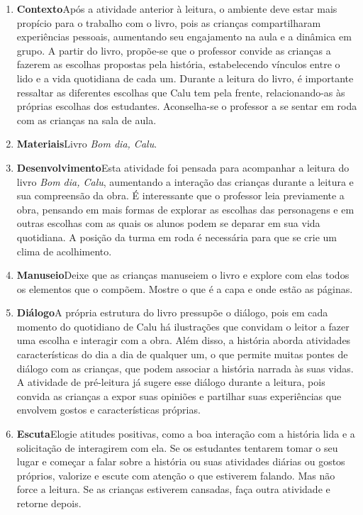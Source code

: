 \documentclass[11pt]{extarticle}
\begin{document}
\begin{enumerate}
\item \textbf{Contexto}\quad Após a atividade anterior à leitura, o ambiente deve estar mais propício para o trabalho com o livro, pois as crianças compartilharam experiências pessoais, aumentando seu engajamento na aula e a dinâmica em grupo. A partir do livro, propõe-se que 
o professor convide as crianças a fazerem as escolhas propostas pela história, estabelecendo vínculos entre o lido e a vida quotidiana de cada um.
Durante a leitura do livro, é importante ressaltar as diferentes escolhas que Calu tem pela frente, relacionando-as às próprias escolhas dos estudantes.
Aconselha-se o professor a se sentar em roda com as crianças na sala de aula.

\item \textbf{Materiais}\quad Livro \textit{Bom dia, Calu}.


\item \textbf{Desenvolvimento}\quad Esta atividade foi pensada para acompanhar a leitura do livro \textit{Bom dia, Calu}, aumentando a interação das crianças durante a leitura e sua compreensão da obra. É interessante que o professor leia previamente a obra, pensando em mais formas de explorar as escolhas das personagens e em outras escolhas com as quais os alunos podem se deparar em sua vida quotidiana.
A posição da turma em roda é necessária para que se crie um clima de acolhimento. 
 
\item \textbf{Manuseio}\quad Deixe que as crianças manuseiem o livro 
e explore com elas todos os elementos que o compõem. Mostre o que é a 
capa e onde estão as páginas.

\item \textbf{Diálogo}\quad A própria estrutura do livro pressupõe o diálogo, pois em cada momento do quotidiano de Calu há ilustrações que convidam o leitor a fazer uma escolha e interagir com a obra. Além disso, a história aborda atividades características do dia a dia de qualquer um, o que permite muitas pontes de diálogo com as crianças, que podem associar a história narrada às suas vidas. A atividade de pré-leitura já sugere esse diálogo durante a leitura, pois convida as crianças a expor suas opiniões e partilhar suas experiências que envolvem gostos e características próprias.

\item \textbf{Escuta}\quad Elogie atitudes positivas, como 
a boa interação com a história lida e a solicitação de interagirem com ela. Se os estudantes tentarem 
tomar o seu lugar e começar a falar sobre a história ou suas atividades diárias ou gostos próprios, valorize e escute com atenção o que estiverem falando. Mas não 
force a leitura. Se as crianças estiverem cansadas, faça outra atividade 
e retorne depois. 


\end{enumerate}
\end{document}
